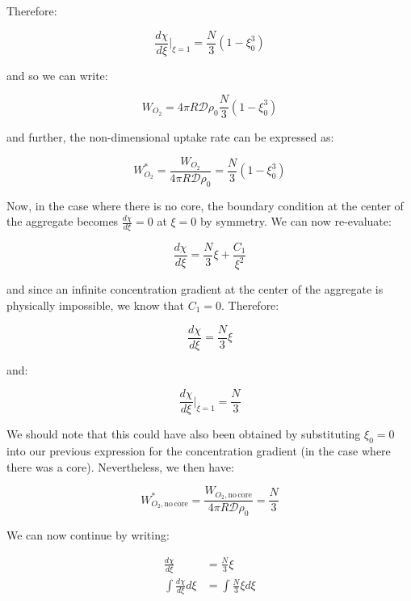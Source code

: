 \documentclass[letterpaper,12pt]{article}
\begin{document}
Therefore:

\begin{equation}
    \frac{d \chi}{d \xi} \big|_{\xi=1} = \frac{N}{3} \left( 1 - \xi_0^3 \right)
\end{equation}

and so we can write:

\begin{equation}
        W_{O_2} = 4\pi R \mathcal{D} \rho_0 \frac{N}{3} \left( 1 - \xi_0^3 \right)
\end{equation}

and further, the non-dimensional uptake rate can be expressed as:

\begin{equation}
    W_{O_2}^* = \frac{W_{O_2}}{4\pi R \mathcal{D} \rho_0} = \frac{N}{3} \left( 1 - \xi_0^3 \right)
\end{equation}

Now, in the case where there is no core, the boundary condition at the center of the aggregate becomes $\frac{d \chi}{d \xi} = 0$ at $\xi = 0$ by symmetry. We can now re-evaluate:

\begin{equation}
    \frac{d \chi}{d \xi} = \frac{N}{3} \xi + \frac{C_1}{\xi^2}
\end{equation}

and since an infinite concentration gradient at the center of the aggregate is physically impossible, we know that $C_1 = 0$. Therefore:

\begin{equation}
    \frac{d \chi}{d \xi} = \frac{N}{3} \xi
\end{equation}

and:

\begin{equation}
    \frac{d \chi}{d \xi} \big|_{\xi=1} = \frac{N}{3}
\end{equation}

We should note that this could have also been obtained by substituting $\xi_0 = 0$ into our previous expression for the concentration gradient (in the case where there was a core). Nevertheless, we then have:

\begin{equation}
    W_{O_2, \mathrm{no \, core}}^* = \frac{W_{O_2, \mathrm{no \, core}}}{4\pi R \mathcal{D} \rho_0} = \frac{N}{3}
\end{equation}

We can now continue by writing:

\begin{equation}
\begin{aligned}
    \frac{d \chi}{d \xi} &= \frac{N}{3} \xi \\
    \int \frac{d \chi}{d \xi} d \xi &= \int\frac{N}{3} \xi d \xi \\
\end{aligned}
\end{equation}
\end{document}
